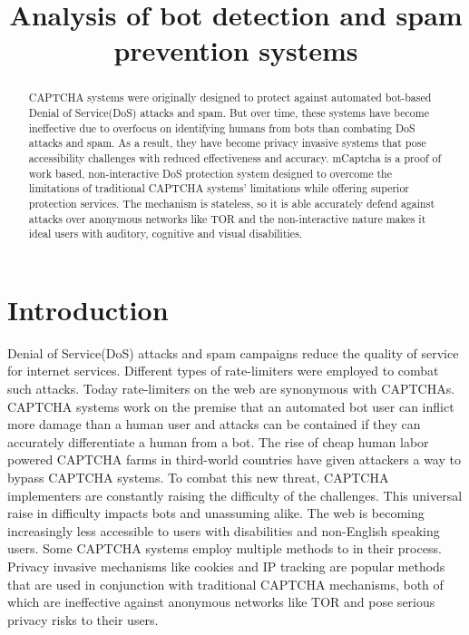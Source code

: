 \documentclass[conference]{IEEEtran}
\begin{document}
\title{Analysis of bot detection and spam prevention systems} 
\author {
}
\maketitle

\begin{abstract}
	CAPTCHA systems were originally designed to protect against automated
	bot-based Denial of Service(DoS) attacks and spam. But over time, these
	systems have become ineffective due to overfocus on identifying humans from
	bots than combating DoS attacks and spam. As a result, they have become
	privacy invasive systems that pose accessibility challenges with reduced
	effectiveness and accuracy. mCaptcha is a proof of work based,
	non-interactive DoS protection system designed to overcome the limitations
	of traditional CAPTCHA systems' limitations while offering superior
	protection services. The mechanism is stateless, so it is able accurately
	defend against attacks over anonymous networks like TOR and the
	non-interactive nature makes it ideal users with auditory, cognitive and
	visual disabilities.
\end{abstract}
 
\section{Introduction}
\label{sec:intro}

Denial of Service(DoS) attacks and spam campaigns reduce the quality of service
for internet services. Different types of rate-limiters were employed to combat
such attacks. Today rate-limiters on the web are synonymous with CAPTCHAs.
CAPTCHA systems work on the premise that an automated bot user can inflict more
damage than a human user and attacks can be contained if they can accurately
differentiate a human from a bot. The rise of cheap human labor powered CAPTCHA
farms in third-world countries have given attackers a way to bypass CAPTCHA
systems. To combat this new threat, CAPTCHA implementers are constantly raising the
difficulty of the challenges. This universal raise in difficulty impacts bots
and unassuming alike. The web is becoming increasingly less accessible to users
with disabilities and non-English speaking users. Some CAPTCHA systems employ
multiple methods to in their process. Privacy invasive mechanisms like cookies
and IP tracking are popular methods that are used in conjunction with
traditional CAPTCHA mechanisms, both of which are ineffective against
anonymous networks like TOR and pose serious privacy risks to their users.
\end{document}
